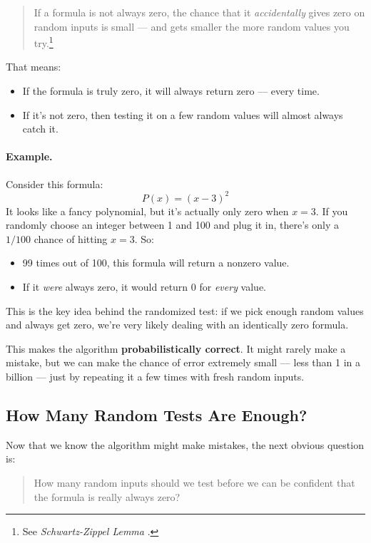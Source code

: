 \begin{quote}
If a formula is not always zero, the chance that it \textit{accidentally} gives zero on random inputs is small — and gets smaller the more random values you try.\footnote{See \textit{Schwartz-Zippel Lemma} \cite{schwartz1980fast,zippel1979probabilistic}.}
\end{quote}

That means:
\begin{itemize}
  \item If the formula is truly zero, it will always return zero — every time.
  \item If it’s not zero, then testing it on a few random values will almost always catch it.
\end{itemize}

\paragraph{Example.}  
Consider this formula:
\[
P(x) = (x - 3)^2
\]
It looks like a fancy polynomial, but it's actually only zero when $x = 3$.  
If you randomly choose an integer between 1 and 100 and plug it in, there's only a $1/100$ chance of hitting $x = 3$. So:

\begin{itemize}
  \item 99 times out of 100, this formula will return a nonzero value.
  \item If it \textit{were} always zero, it would return 0 for \textit{every} value.
\end{itemize}

This is the key idea behind the randomized test: if we pick enough random values and always get zero, we're very likely dealing with an identically zero formula.

\medskip
This makes the algorithm \textbf{probabilistically correct}. It might rarely make a mistake, but we can make the chance of error extremely small — less than 1 in a billion — just by repeating it a few times with fresh random inputs.


\subsection*{How Many Random Tests Are Enough?}

Now that we know the algorithm might make mistakes, the next obvious question is:

\begin{quote}
How many random inputs should we test before we can be confident that the formula is really always zero?
\end{quote}

